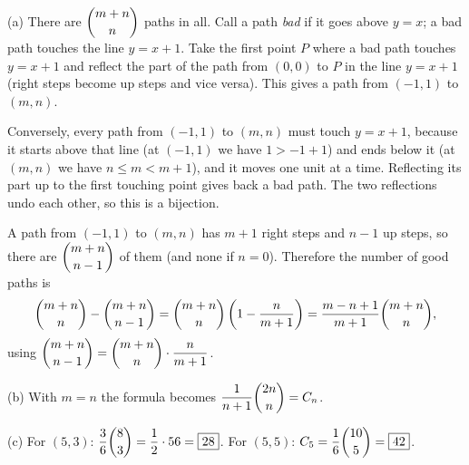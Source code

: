 (a) There are $\dbinom{m+n}{n}$ paths in all. Call a path \emph{bad} if it goes above $y=x$; a bad path touches the line $y=x+1$. Take the first point $P$ where a bad path touches $y=x+1$ and reflect the part of the path from $(0,0)$ to $P$ in the line $y=x+1$ (right steps become up steps and vice versa). This gives a path from $(-1,1)$ to $(m,n)$.

Conversely, every path from $(-1,1)$ to $(m,n)$ must touch $y=x+1$, because it starts above that line (at $(-1,1)$ we have $1>-1+1$) and ends below it (at $(m,n)$ we have $n\le m<m+1$), and it moves one unit at a time. Reflecting its part up to the first touching point gives back a bad path. The two reflections undo each other, so this is a bijection.

A path from $(-1,1)$ to $(m,n)$ has $m+1$ right steps and $n-1$ up steps, so there are $\dbinom{m+n}{n-1}$ of them (and none if $n=0$). Therefore the number of good paths is
\[\dbinom{m+n}{n}-\dbinom{m+n}{n-1}=\dbinom{m+n}{n}\left(1-\dfrac{n}{m+1}\right)=\dfrac{m-n+1}{m+1}\dbinom{m+n}{n},\]
using $\dbinom{m+n}{n-1}=\dbinom{m+n}{n}\cdot\dfrac{n}{m+1}$.

(b) With $m=n$ the formula becomes $\dfrac{1}{n+1}\dbinom{2n}{n}=C_n$.

(c) For $(5,3)$: $\dfrac{3}{6}\dbinom{8}{3}=\dfrac{1}{2}\cdot56=\boxed{28}$. For $(5,5)$: $C_5=\dfrac{1}{6}\dbinom{10}{5}=\boxed{42}$.

